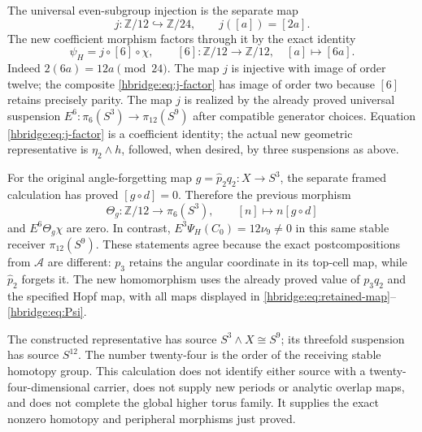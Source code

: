 \documentclass[11pt]{article}
\theoremstyle{definition}
\begin{document}
The universal even-subgroup injection is the separate map
\[
j:\mathbb Z/12\hookrightarrow\mathbb Z/24,
\qquad j([a])=[2a].
\]
The new coefficient morphism factors through it by the exact
identity
\begin{equation}
\psi_H=j\circ[6]\circ\chi,
\qquad [6]:\mathbb Z/12\longrightarrow\mathbb Z/12,
\quad [a]\longmapsto[6a].
\label{hbridge:eq:j-factor}
\end{equation}
Indeed \(2(6a)=12a\pmod{24}\). The map \(j\) is
injective with image of order twelve; the composite
\eqref{hbridge:eq:j-factor} has image of order two because
\([6]\) retains precisely parity. The map \(j\) is realized
by the already proved universal suspension
\(E^6:\pi_6(S^3)\to\pi_{12}(S^9)\) after compatible
generator choices. Equation \eqref{hbridge:eq:j-factor} is a
coefficient identity; the actual new geometric representative is
\(\eta_2\wedge h\), followed, when desired, by three
suspensions as above.

For the original angle-forgetting map
\(g=\widehat p_2q_2:X\to S^3\), the separate framed
calculation has proved \([g\circ d]=0\). Therefore the
previous morphism
\[
\Theta_g:\mathbb Z/12\longrightarrow\pi_6(S^3),
\qquad [n]\longmapsto n[g\circ d]
\]
and \(E^6\Theta_g\chi\) are zero. In contrast,
\(E^3\Psi_H(C_0)=12\nu_9\ne0\) in this same stable
receiver \(\pi_{12}(S^9)\). These statements agree because
the exact postcompositions from \(\mathcal A\) are different:
\(p_3\) retains the angular coordinate in its top-cell map,
while \(\widehat p_2\) forgets it. The new homomorphism
uses the already proved value of \(p_3q_2\) and the specified
Hopf map, with all maps displayed in
\eqref{hbridge:eq:retained-map}--\eqref{hbridge:eq:Psi}.

The constructed representative has source \(S^3\wedge X\cong
S^9\); its threefold suspension has source \(S^{12}\).
The number twenty-four is the order of the receiving stable
homotopy group. This calculation does not identify either source
with a twenty-four-dimensional carrier, does not supply new
periods or analytic overlap maps, and does not complete the
global higher torus family. It supplies the exact nonzero
homotopy and peripheral morphisms just proved.
\end{document}
